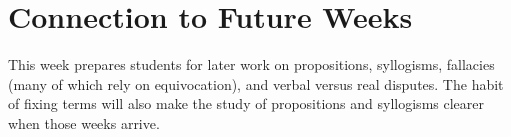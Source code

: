 \documentclass[12pt]{article}
\begin{document}
\section*{Connection to Future Weeks}
This week prepares students for later work on propositions, syllogisms, fallacies (many of which rely on equivocation), and verbal versus real disputes. The habit of fixing terms will also make the study of propositions and syllogisms clearer when those weeks arrive.
\end{document}
